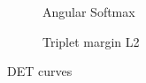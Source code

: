 \begin{figure}[h]
\begin{center}
\begin{subfigure}[t]{7.5cm}
		\caption{Angular Softmax}
	\end{subfigure}
	\begin{subfigure}[t]{7.5cm}
		\caption{Triplet margin L2}
	\end{subfigure}
\end{center}
\caption{DET curves}
\label{fig:det}
\end{figure}
